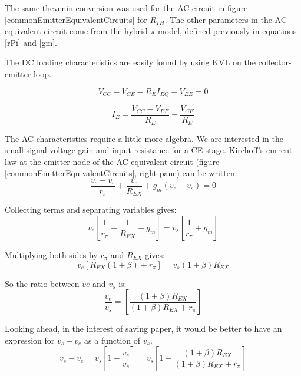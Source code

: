 \documentclass[titlepage, letterpaper, 10.5pt]{article}
\begin{document}
The same thevenin conversion was used for the AC circuit in figure
\ref{commonEmitterEquivalentCircuits} for $R_{TH}$. The other
parameters in the AC equivalent circuit come from the hybrid-$\pi$
model, defined previously in equations \ref{rPi} and \ref{gm}.

The DC loading characteristics are easily found by using KVL on the
collector-emitter loop.

\begin{equation*}
V_{CC}-V_{CE}-R_{E}I_{EQ}-V_{EE}=0
\end{equation*}

\begin{equation}
I_{E}=\frac{V_{CC}-V_{EE}}{R_{E}}-\frac{V_{CE}}{R_{E}}
\label{ceDCloadEquation}
\end{equation}

The AC characteristics require a little more algebra. We are
interested in the small signal voltage gain and input resistance
for a CE stage. Kirchoff's current law at the emitter node of the 
AC equivalent circuit (figure \ref{commonEmitterEquivalentCircuits},
right pane) can be written:
\begin{equation*}
\frac{v_{e}-v_{s}}{r_{\pi}}+\frac{v_{e}}{R_{EX}}+g_{m}(v_{e}-v_{s})=0
\end{equation*}

Collecting terms and separating variables gives:
\begin{equation*}
v_{e}\left[\frac{1}{r_{\pi}}+\frac{1}{R_{EX}}+g_{m}\right]
=v_{s}\left[\frac{1}{r_{\pi}}+g_{m}\right]
\end{equation*}

Multiplying both sides by $r_{\pi}$ and $R_{EX}$ gives:
\begin{equation*}
v_{e}[R_{EX}(1+\beta)+r_{\pi}]=v_{s}(1+\beta)R_{EX}
\end{equation*}

So the ratio between $v{e}$ and $v_{s}$ is:
\begin{equation*}
\frac{v_{e}}{v_{s}}=
\left[\frac{(1+\beta)R_{EX}}{(1+\beta)R_{EX}+r_{\pi}}\right]
\end{equation*}

Looking ahead, in the interest of saving paper, it would be better
to have an expression for $v_{s}-v_{e}$ as a function of $v_{s}$.
\begin{equation*}
v_{s}-v_{e}=
v_{s}\left[1-\frac{v_{e}}{v_{s}}\right]=
v_{s}\left[1-\frac{(1+\beta)R_{EX}}{(1+\beta)R_{EX}+r_{\pi}}\right]
\end{equation*}
\end{document}
